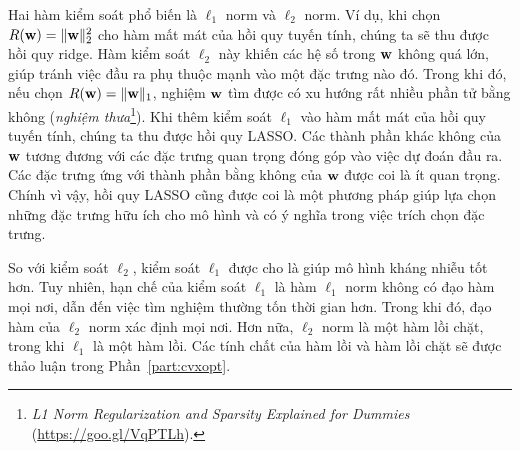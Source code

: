 


Hai hàm kiểm soát phổ biến là $\ell_1$ norm và $\ell_2$ norm.
Ví dụ, khi chọn $R(\mathbf{w}) = \|\mathbf{w}\|_2^2$ cho hàm mất mát của hồi quy tuyến tính,
chúng ta sẽ thu được hồi quy ridge. Hàm kiểm soát $\ell_2$ này khiến các hệ số
trong $\mathbf{w}$ không quá lớn, giúp tránh việc đầu ra phụ thuộc mạnh vào một
đặc trưng nào đó. Trong khi đó, nếu chọn $R(\mathbf{w}) = \|\mathbf{w}\|_1$, nghiệm $\mathbf{w}$ tìm
được có xu hướng rất nhiều phần tử bằng không (\textit{nghiệm thưa}\footnote{\textit{L1 Norm Regularization and Sparsity Explained for
Dummies} (\url{https://goo.gl/VqPTLh}).}). Khi thêm kiểm soát $\ell_1$ vào
hàm mất mát của hồi quy tuyến tính, chúng ta thu được hồi quy LASSO. Các
thành phần khác không của $\mathbf{w}$ tương đương với các đặc trưng quan trọng đóng
góp vào việc dự đoán đầu ra. Các đặc trưng ứng với thành phần bằng không của
$\mathbf{w}$ được coi là ít quan trọng. Chính vì vậy, hồi quy LASSO cũng được coi là
một phương pháp giúp lựa chọn những đặc trưng hữu ích cho mô hình và có ý nghĩa trong việc trích chọn đặc trưng.

So với kiểm soát $\ell_2$, kiểm soát $\ell_1$ được cho là giúp mô hình kháng nhiễu tốt hơn. Tuy nhiên, hạn chế của kiểm soát $\ell_1$ là hàm $\ell_1$ norm không có đạo hàm mọi nơi, dẫn đến việc tìm nghiệm thường tốn thời gian hơn. Trong khi đó, đạo hàm của $\ell_2$ norm xác định mọi nơi. Hơn nữa, $\ell_2$ norm là một hàm lồi chặt, trong khi $\ell_1$ là một hàm lồi. Các tính chất của hàm lồi và hàm lồi chặt sẽ được thảo luận trong Phần~\ref{part:cvxopt}.


